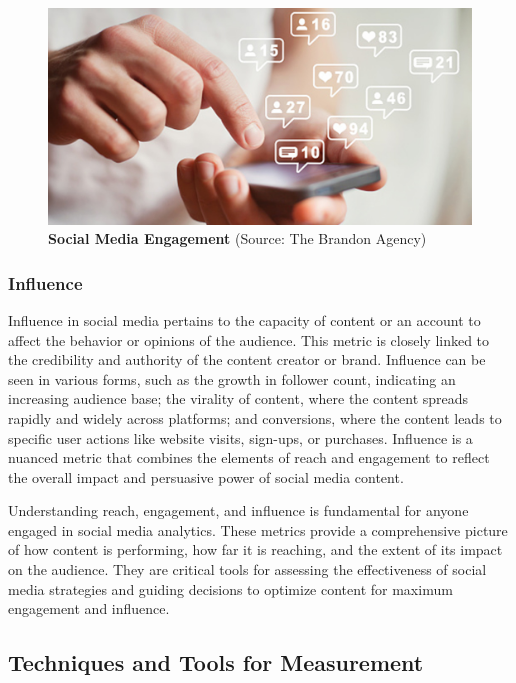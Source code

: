 \documentclass[
]{book}
\begin{document}
\begin{figure}
\centering
\includegraphics[width=1\textwidth,height=\textheight]{images/engagement.jpg}
\caption{\textbf{Social Media Engagement} (Source: The Brandon Agency)}
\end{figure}

\hypertarget{influence}{%
\subsubsection*{Influence}\label{influence}}

Influence in social media pertains to the capacity of content or an account to affect the behavior or opinions of the audience. This metric is closely linked to the credibility and authority of the content creator or brand. Influence can be seen in various forms, such as the growth in follower count, indicating an increasing audience base; the virality of content, where the content spreads rapidly and widely across platforms; and conversions, where the content leads to specific user actions like website visits, sign-ups, or purchases. Influence is a nuanced metric that combines the elements of reach and engagement to reflect the overall impact and persuasive power of social media content.

Understanding reach, engagement, and influence is fundamental for anyone engaged in social media analytics. These metrics provide a comprehensive picture of how content is performing, how far it is reaching, and the extent of its impact on the audience. They are critical tools for assessing the effectiveness of social media strategies and guiding decisions to optimize content for maximum engagement and influence.

\hypertarget{techniques-and-tools-for-measurement}{%
\subsection*{Techniques and Tools for Measurement}\label{techniques-and-tools-for-measurement}}
\end{document}
